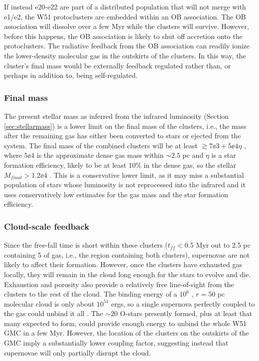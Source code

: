 If instead e20-e22 are part of a distributed population that will not merge
with e1/e2, the W51 protoclusters are embedded within an OB association.  The
OB association will dissolve over a few Myr while the clusters will survive.
However, before this happens, the OB association is likely to shut off
accretion onto the protoclusters.  The radiative feedback from the OB
association can readily ionize the lower-density molecular gas in the outskirts
of the clusters.  In this way, the cluster's final mass would be externally
feedback regulated rather than, or perhaps in addition to, being
self-regulated.



\subsubsection{Final mass}
The present stellar mass as inferred from the infrared luminosity (Section
\ref{sec:stellarmass}) is a lower limit on the final mass of the clusters,
i.e., the mass after the remaining gas has either been converted to stars or
ejected from the system.  The final mass of the combined clusters will be at
least $\gtrsim7\ee{3} + 5\ee{4} \eta$ \msun, where $5\ee{4}$ \msun is the
approximate dense gas mass within $\sim2.5$ pc and $\eta$ is a star formation
efficiency, likely to be at least 10\% in the dense gas, so the stellar
$M_{final} > 1.2\ee{4}$ \msun.  This is a conservative lower limit, as it may
miss a substantial population of stars whose luminosity is not reprocessed into
the infrared and it uses conservatively low estimates for the gas mass and the
star formation efficiency.

\subsubsection{Cloud-scale feedback}
Since the free-fall time is short within these clusters ($t_{ff} < 0.5$ Myr out
to 2.5 pc containing 5 \msun of gas, i.e., the region containing both
clusters), supernovae are not likely
to affect their formation.  However, once the clusters have exhausted gas
locally, they
will remain in the cloud long enough for the stars to evolve and die.
Exhaustion and porosity also provide a relatively free line-of-sight from the
clusters to the rest
of the cloud.  The binding energy of a $10^6$ \msun, $r=50$ pc 
molecular cloud is only about $10^{51}$ ergs, so a single supernova perfectly
coupled to the gas could unbind it all \citep[though typical energy delivered
to molecular clouds is lower, $\sim0.01-0.25$; see references in][appendix
B]{Kruijssen2012a}.  The $\sim20$ O-stars presently formed,
plus at least that many expected to form, could provide enough energy
to unbind the whole W51 GMC in a few Myr.  However, the location of the clusters
on the outskirts of the GMC imply a substantially lower coupling factor,
suggesting instead that supernovae will only partially disrupt the cloud.

